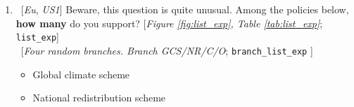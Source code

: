 \begin{enumerate}[resume]
\item ~[\textit{Eu}, \textit{US1}]  \label{q:list_exp} Beware, this question is quite unusual. Among the policies below, \textbf{how many} do you support? [\textit{Figure \ref{fig:list_exp}, Table \ref{tab:list_exp}}; \verb|list_exp|]\\
~[\textit{Four random branches. Branch GCS/NR/C/O}; \verb|branch_list_exp| ] \\
\begin{itemize} \vspace{-1em}
    \item Global climate scheme 
    \item National redistribution scheme

\end{itemize}
\end{enumerate}
